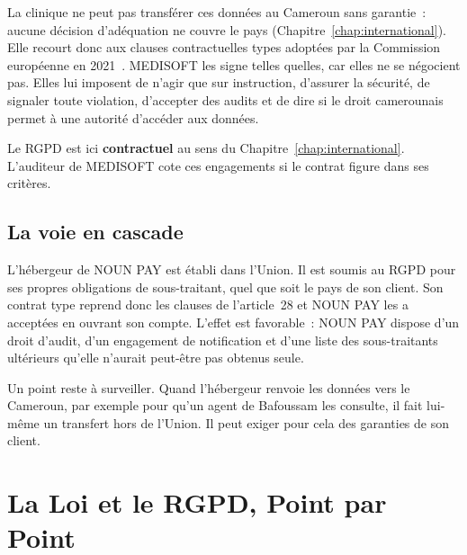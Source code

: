 La clinique ne peut pas transférer ces données au Cameroun sans garantie~:
aucune décision d'adéquation ne couvre le pays
(Chapitre~\ref{chap:international}). Elle recourt donc aux clauses
contractuelles types adoptées par la Commission européenne en
2021~\cite{ue2021clauses}. MEDISOFT les signe telles quelles, car elles ne
se négocient pas. Elles lui imposent de n'agir que sur instruction,
d'assurer la sécurité, de signaler toute violation, d'accepter des audits et
de dire si le droit camerounais permet à une autorité d'accéder aux données.

Le RGPD est ici \textbf{contractuel} au sens du
Chapitre~\ref{chap:international}. L'auditeur de MEDISOFT cote ces
engagements si le contrat figure dans ses critères.

\subsection{La voie en cascade}

L'hébergeur de NOUN PAY est établi dans l'Union. Il est soumis au RGPD pour
ses propres obligations de sous-traitant, quel que soit le pays de son
client. Son contrat type reprend donc les clauses de l'article~28 et NOUN
PAY les a acceptées en ouvrant son compte. L'effet est favorable~: NOUN PAY
dispose d'un droit d'audit, d'un engagement de notification et d'une liste
des sous-traitants ultérieurs qu'elle n'aurait peut-être pas obtenus seule.

Un point reste à surveiller. Quand l'hébergeur renvoie les données vers le
Cameroun, par exemple pour qu'un agent de Bafoussam les consulte, il fait
lui-même un transfert hors de l'Union. Il peut exiger pour cela des
garanties de son client.

\section{La Loi et le RGPD, Point par Point}
\label{sec:c04-comparaison}

